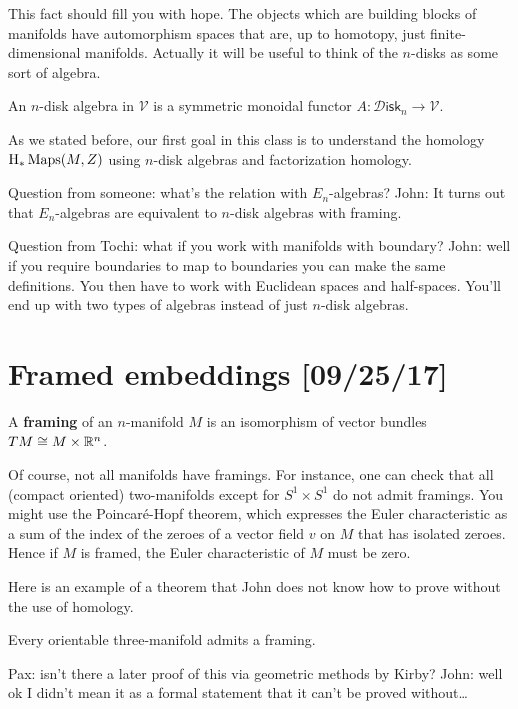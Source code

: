 \documentclass{amsart}
\begin{document}
This fact should fill you with hope. The objects which are building blocks of manifolds
have automorphism spaces that are, up to homotopy, just finite-dimensional manifolds.
Actually it will be useful to think of the $n$-disks as some sort of algebra.

\begin{definition}
    An $n$-disk algebra in $\mathcal{V}$ is a symmetric monoidal functor
    $A:\mathcal{D}\mathsf{isk}_n\to\mathcal{V}$.
\end{definition}

As we stated before, our first goal in this class is to understand the homology 
$\operatorname{H}_*\operatorname{Maps}(M,Z)$ using $n$-disk algebras and factorization homology.

Question from someone: what's the relation with $E_n$-algebras? John: It turns
out that $E_n$-algebras are equivalent to $n$-disk algebras with framing.

Question from Tochi: what if you work with manifolds with boundary? John: well
if you require boundaries to map to boundaries you can make the same definitions.
You then have to work with Euclidean spaces and half-spaces. You'll end up
with two types of algebras instead of just $n$-disk algebras.

\section{Framed embeddings [09/25/17]}

\begin{definition}
    A \textbf{framing} of an $n$-manifold $M$ is an isomorphism of vector bundles
    $TM \cong M\times \mathbb{R}^n$.
\end{definition}

Of course, not all manifolds have framings. For instance, one
can check that all (compact oriented) two-manifolds except for $S^1\times S^1$ do not admit framings.
You might use the Poincar\'e-Hopf theorem, which expresses the Euler characteristic
as a sum of the index of the zeroes of a vector field $v$ on $M$ that has isolated
zeroes. Hence if $M$ is framed, the Euler characteristic of $M$ must be zero.

Here is an example of a theorem that John does not know how to prove without the use of homology.
\begin{theorem}[Whitney or Wu]
    Every orientable three-manifold admits a framing.
\end{theorem}
Pax: isn't there a later proof of this via geometric methods by Kirby? John: well ok
I didn't mean it as a formal statement that it can't be proved without\ldots
\end{document}
